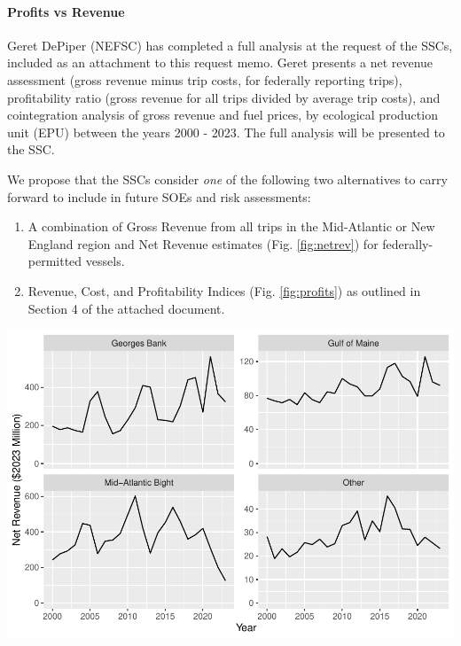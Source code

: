\documentclass[
  10pt,
]{article}
\providecommand{\tightlist}{%
  \setlength{\itemsep}{0pt}\setlength{\parskip}{0pt}}
\let\origfigure\figure
\let\endorigfigure\endfigure
\renewenvironment{figure}[1][2] {
    \expandafter\origfigure\expandafter[H]
} {
    \endorigfigure
}
\begin{document}
\hypertarget{profits-vs-revenue}{%
\paragraph{Profits vs Revenue}\label{profits-vs-revenue}}

Geret DePiper (NEFSC) has completed a full analysis at the request of
the SSCs, included as an attachment to this request memo. Geret presents
a net revenue assessment (gross revenue minus trip costs, for federally
reporting trips), profitability ratio (gross revenue for all trips
divided by average trip costs), and cointegration analysis of gross
revenue and fuel prices, by ecological production unit (EPU) between the
years 2000 - 2023. The full analysis will be presented to the SSC.

We propose that the SSCs consider \emph{one} of the following two
alternatives to carry forward to include in future SOEs and risk
assessments:

\begin{enumerate}
\def\labelenumi{\arabic{enumi}.}
\tightlist
\item
  A combination of Gross Revenue from all trips in the Mid-Atlantic or
  New England region and Net Revenue estimates (Fig. \ref{fig:netrev})
  for federally-permitted vessels.\\
\item
  Revenue, Cost, and Profitability Indices (Fig. \ref{fig:profits}) as
  outlined in Section 4 of the attached document.
\end{enumerate}

\begin{figure}

{\centering \includegraphics[width=0.8\linewidth]{images/netrev-1} 

}

\caption{Net revenue generated by federally permitted trips}\label{fig:netrev}
\end{figure}
\end{document}
